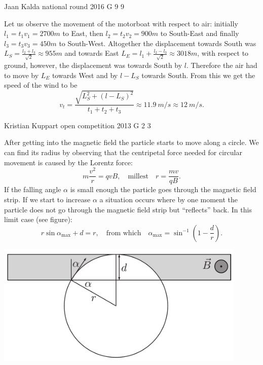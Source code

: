 \documentclass[11pt]{article}
\begin{document}
{Jaan Kalda} %
{national round} %
{2016} %
{G 9} %
{9} %
{

\ifEngSolution
Let us observe the movement of the motorboat with respect to air: initially $l_1=t_1v_1=\SI{2700}m$ to East, then $l_2=t_2v_2=\SI{900}m$ to South-East and finally $l_3=t_3v_3=\SI{450}m$ to South-West. Altogether the displacement towards South was $L_S=\frac{l_2+l_3}{\sqrt 2}\approx \SI{955}m$ and towards East $L_E=l_1+\frac{l_2-l_3}{\sqrt 2}\approx \SI{3018}m$, with respect to ground, however, the displacement was towards South by $l$. Therefore the air had to move by $L_E$ towards West and by $l-L_S$ towards South. From this we get the speed of the wind to be
$$v_t=\frac{\sqrt{L_S^2+(l-L_S)^2}}{t_1+t_2+t_3}\approx \SI{11.9}{m/s}\approx \SI{12}{m/s}.$$
\fi
}

{Kristian Kuppart} %
{open competition} %
{2013} %
{G 2} %
{3} %
{

\ifEngSolution
After getting into the magnetic field the particle starts to move along a circle. We can find its radius by observing that the centripetal force needed for circular movement is caused by the Lorentz force:
\[m\frac{v^2}{r}=qvB, \quad \text{millest} \quad r=\frac{mv}{qB}.\]
If the falling angle $\alpha$ is small enough the particle goes through the magnetic field strip. If we start to increase $\alpha$ a situation occurs where by one moment the particle does not go through the magnetic field strip but “reflects” back. In this limit case (see figure):
\[r\sin\alpha_\text{max}+d=r, \quad \text{from which} \quad \alpha_\text{max}=\sin^{-1}\left(1-\frac{d}{r}\right).\]
\begin{center}
\includegraphics[width=0.9\textwidth]{2013-lahg-02-magPeegLah}
\end{center}
\fi
}
\end{document}
